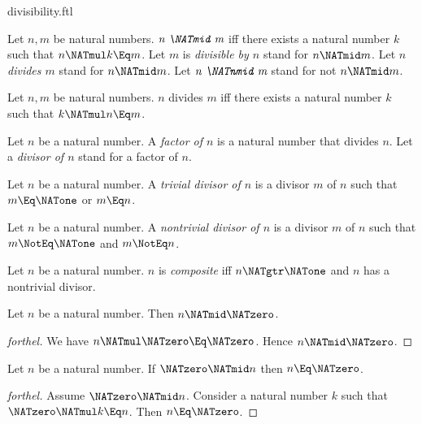\documentclass{stex}
\begin{document}
\begin{smodule}{divisibility.ftl}

\begin{definition}[forthel]
  Let $n, m$ be natural numbers.
  $\emph{n \NATmid m}$ iff there exists a natural number $k$ such that $n \NATmul k \Eq m$.
  Let $m$ is \emph{divisible by $n$} stand for $n \NATmid m$.
  Let $n$ \emph{divides $m$} stand for $n \NATmid m$.
  Let $\emph{n \NATnmid m}$ stand for not $n \NATmid m$.
\end{definition}

\begin{lemma}[forthel]
  Let $n, m$ be natural numbers.
  $n$ divides $m$ iff there exists a natural number $k$ such that $k \NATmul n \Eq m$.
\end{lemma}

\begin{definition}[forthel]
  Let $n$ be a natural number.
  A \emph{factor of $n$} is a natural number that divides $n$.
  Let a \emph{divisor of $n$} stand for a factor of $n$.
\end{definition}

\begin{definition}[forthel]
  Let $n$ be a natural number.
  A \emph{trivial divisor of $n$} is a divisor $m$ of $n$ such that $m \Eq \NATone$ or $m \Eq n$.
\end{definition}

\begin{definition}[forthel]
  Let $n$ be a natural number.
  A \emph{nontrivial divisor of $n$} is a divisor $m$ of $n$ such that $m \NotEq \NATone$ and $m \NotEq n$.
\end{definition}

\begin{definition}[forthel]
  Let $n$ be a natural number.
  $n$ is \emph{composite} iff $n \NATgtr \NATone$ and $n$ has a nontrivial divisor.
\end{definition}

\begin{proposition}[forthel]
  Let $n$ be a natural number.
  Then $n \NATmid \NATzero$.
\end{proposition}
\begin{proof}[forthel]
  We have $n \NATmul \NATzero \Eq \NATzero$.
  Hence $n \NATmid \NATzero$.
\end{proof}

\begin{proposition}[forthel]
  Let $n$ be a natural number.
  If $\NATzero \NATmid n$ then $n \Eq \NATzero$.
\end{proposition}
\begin{proof}[forthel]
  Assume $\NATzero \NATmid n$.
  Consider a natural number $k$ such that $\NATzero \NATmul k \Eq n$.
  Then $n \Eq \NATzero$.
\end{proof}


\end{smodule}
\end{document}

